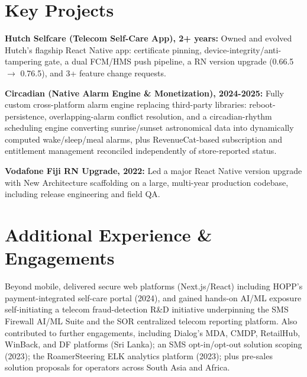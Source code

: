 \documentclass[10.5pt]{article}
\begin{document}
\section*{Key Projects}
\begin{cvitems}
  \item \textbf{Hutch Selfcare (Telecom Self-Care App), 2+ years:} Owned and evolved Hutch's flagship React Native app: certificate pinning, device-integrity/anti-tampering gate, a dual FCM/HMS push pipeline, a RN version upgrade (0.66.5 $\rightarrow$ 0.76.5), and 3+ feature change requests.
  \item \textbf{Circadian (Native Alarm Engine \& Monetization), 2024-2025:} Fully custom cross-platform alarm engine replacing third-party libraries: reboot-persistence, overlapping-alarm conflict resolution, and a circadian-rhythm scheduling engine converting sunrise/sunset astronomical data into dynamically computed wake/sleep/meal alarms, plus RevenueCat-based subscription and entitlement management reconciled independently of store-reported status.
  \item \textbf{Vodafone Fiji RN Upgrade, 2022:} Led a major React Native version upgrade with New Architecture scaffolding on a large, multi-year production codebase, including release engineering and field QA.
\end{cvitems}

\section*{Additional Experience \& Engagements}
Beyond mobile, delivered secure web platforms (Next.js/React) including HOPP's payment-integrated self-care portal (2024), and gained hands-on AI/ML exposure self-initiating a telecom fraud-detection R\&D initiative underpinning the SMS Firewall AI/ML Suite and the SOR centralized telecom reporting platform. Also contributed to further engagements, including Dialog's MDA, CMDP, RetailHub, WinBack, and DF platforms (Sri Lanka); an SMS opt-in/opt-out solution scoping (2023); the RoamerSteering ELK analytics platform (2023); plus pre-sales solution proposals for operators across South Asia and Africa.
\end{document}
